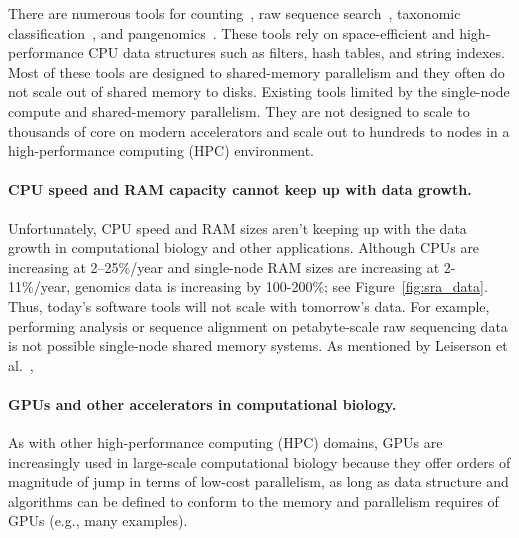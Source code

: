There are numerous tools for \kmer counting~\cite{MarccaisKi11,PandeyBJP17a}, raw sequence search~\cite{solomon2016fast,PandeyABFJP18Cell}, taxonomic classification~\cite{wood2014kraken,wood2019improved}, and pangenomics~\cite{garrison2018variation,pandey2021variantstore}. These tools rely on space-efficient and high-performance CPU data structures such as filters, hash tables, and string indexes. Most of these tools are designed to shared-memory parallelism and they often do not scale out of shared memory to disks.
Existing tools limited by the single-node compute and shared-memory parallelism. They are not designed to scale to thousands of core on modern accelerators and scale out to hundreds to nodes in a high-performance computing (HPC) environment.



\paragraph{CPU speed and RAM capacity cannot keep up with data growth.}
Unfortunately, CPU speed and RAM sizes aren't keeping up with the data growth in computational biology and other applications.
Although CPUs are increasing at 2--25\%/year and single-node RAM sizes are increasing at 2-11\%/year, genomics data is increasing by 100-200\%; see Figure~\ref{fig:sra_data}.
Thus, today's software tools will not scale with tomorrow's data. For example, performing \kmer analysis or sequence alignment on petabyte-scale raw sequencing data is not possible single-node shared memory systems.
As mentioned by Leiserson et al.~\cite{leiserson2020there}, 




\paragraph{GPUs and other accelerators in computational biology.}
As with other high-performance computing (HPC) domains, 
GPUs are increasingly used in large-scale computational biology because they offer orders of magnitude of jump in terms of low-cost parallelism, as long as data structure and algorithms can be defined to conform to the memory and parallelism requires of GPUs (e.g., many examples).

